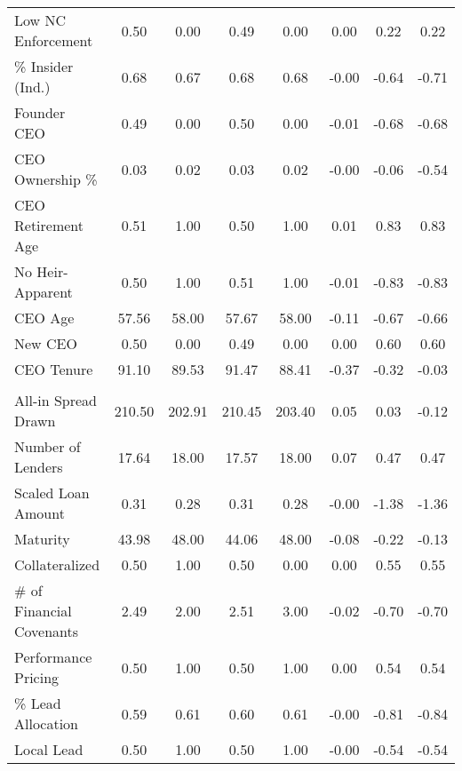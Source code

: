 {\begin{tabular}{l*{1}{ccccccc}}
Low NC Enforcement  &        0.50&        0.00&        0.49&        0.00&        0.00         &        0.22&        0.22         \\
\% Insider (Ind.)   &        0.68&        0.67&        0.68&        0.68&       -0.00         &       -0.64&       -0.71         \\
Founder CEO         &        0.49&        0.00&        0.50&        0.00&       -0.01         &       -0.68&       -0.68         \\
CEO Ownership \%    &        0.03&        0.02&        0.03&        0.02&       -0.00         &       -0.06&       -0.54         \\
CEO Retirement Age  &        0.51&        1.00&        0.50&        1.00&        0.01         &        0.83&        0.83         \\
No Heir-Apparent    &        0.50&        1.00&        0.51&        1.00&       -0.01         &       -0.83&       -0.83         \\
CEO Age             &       57.56&       58.00&       57.67&       58.00&       -0.11         &       -0.67&       -0.66         \\
New CEO             &        0.50&        0.00&        0.49&        0.00&        0.00         &        0.60&        0.60         \\
CEO Tenure          &       91.10&       89.53&       91.47&       88.41&       -0.37         &       -0.32&       -0.03         \\
\addlinespace \multicolumn{8}{l}{\textbf{Loan Characteristics}} \\ All-in Spread Drawn &      210.50&      202.91&      210.45&      203.40&        0.05         &        0.03&       -0.12         \\
Number of Lenders   &       17.64&       18.00&       17.57&       18.00&        0.07         &        0.47&        0.47         \\
Scaled Loan Amount  &        0.31&        0.28&        0.31&        0.28&       -0.00         &       -1.38&       -1.36         \\
Maturity            &       43.98&       48.00&       44.06&       48.00&       -0.08         &       -0.22&       -0.13         \\
Collateralized      &        0.50&        1.00&        0.50&        0.00&        0.00         &        0.55&        0.55         \\
\# of Financial Covenants&        2.49&        2.00&        2.51&        3.00&       -0.02         &       -0.70&       -0.70         \\
Performance Pricing &        0.50&        1.00&        0.50&        1.00&        0.00         &        0.54&        0.54         \\
\% Lead Allocation  &        0.59&        0.61&        0.60&        0.61&       -0.00         &       -0.81&       -0.84         \\
Local Lead          &        0.50&        1.00&        0.50&        1.00&       -0.00         &       -0.54&       -0.54         \\
\bottomrule
\end{tabular}
}
